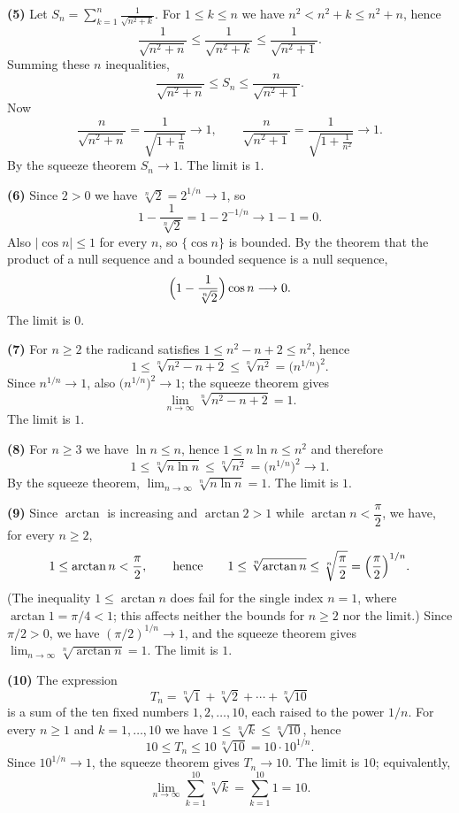 \documentclass[11pt,a4paper]{article}
\newenvironment{solution}[1]{%
  \par\addvspace{1.7ex}%
  \noindent{\color{solutioncolor}\textbf{#1}}\hspace{0.55em}\ignorespaces}%
  {\par\addvspace{0.9ex}}
\begin{document}
\begin{solution}{Solution 2.1.4}
\medskip
\noindent\textbf{(5)} Let
$S_n=\displaystyle\sum_{k=1}^{n}\frac{1}{\sqrt{n^{2}+k}}$. For $1\le k\le n$ we
have $n^{2}<n^{2}+k\le n^{2}+n$, hence
\[
  \frac{1}{\sqrt{n^{2}+n}}\le\frac{1}{\sqrt{n^{2}+k}}\le\frac{1}{\sqrt{n^{2}+1}} .
\]
Summing these $n$ inequalities,
\[
  \frac{n}{\sqrt{n^{2}+n}}\le S_n\le\frac{n}{\sqrt{n^{2}+1}} .
\]
Now
\[
  \frac{n}{\sqrt{n^{2}+n}}=\frac{1}{\sqrt{1+\tfrac1n}}\longrightarrow1,
  \qquad
  \frac{n}{\sqrt{n^{2}+1}}=\frac{1}{\sqrt{1+\tfrac{1}{n^{2}}}}\longrightarrow1 .
\]
By the squeeze theorem $S_n\to1$. The limit is $\boxed{1}$.

\medskip
\noindent\textbf{(6)} Since $2>0$ we have $\sqrt[n]{2}=2^{1/n}\to1$, so
\[
  1-\frac{1}{\sqrt[n]{2}}=1-2^{-1/n}\longrightarrow1-1=0 .
\]
Also $|\cos n|\le1$ for every $n$, so $\{\cos n\}$ is bounded. By the theorem
that the product of a null sequence and a bounded sequence is a null sequence,
\[
  \Bigl(1-\frac{1}{\sqrt[n]{2}}\Bigr)\cos n\longrightarrow0 .
\]
The limit is $\boxed{0}$.

\medskip
\noindent\textbf{(7)} For $n\ge2$ the radicand satisfies
$1\le n^{2}-n+2\le n^{2}$, hence
\[
  1\le\sqrt[n]{n^{2}-n+2}\le\sqrt[n]{n^{2}}=\bigl(n^{1/n}\bigr)^{2} .
\]
Since $n^{1/n}\to1$, also $\bigl(n^{1/n}\bigr)^{2}\to1$; the squeeze theorem gives
\[
  \lim_{n\to\infty}\sqrt[n]{n^{2}-n+2}=1 .
\]
The limit is $\boxed{1}$.

\medskip
\noindent\textbf{(8)} For $n\ge3$ we have $\ln n\le n$, hence
$1\le n\ln n\le n^{2}$ and therefore
\[
  1\le\sqrt[n]{n\ln n}\le\sqrt[n]{n^{2}}=\bigl(n^{1/n}\bigr)^{2}\longrightarrow1 .
\]
By the squeeze theorem, $\displaystyle\lim_{n\to\infty}\sqrt[n]{n\ln n}=1$. The
limit is $\boxed{1}$.

\medskip
\noindent\textbf{(9)} Since $\arctan$ is increasing and $\arctan 2>1$ while
$\arctan n<\dfrac\pi2$, we have, for every $n\ge2$,
\[
  1\le\arctan n<\frac\pi2,
  \qquad\text{hence}\qquad
  1\le\sqrt[n]{\arctan n}\le\sqrt[n]{\frac\pi2}=\Bigl(\frac\pi2\Bigr)^{1/n} .
\]
(The inequality $1\le\arctan n$ does fail for the single index $n=1$, where
$\arctan1=\pi/4<1$; this affects neither the bounds for $n\ge2$ nor the limit.)
Since $\pi/2>0$, we have $(\pi/2)^{1/n}\to1$, and the squeeze theorem gives
$\displaystyle\lim_{n\to\infty}\sqrt[n]{\arctan n}=1$. The limit is
$\boxed{1}$.

\medskip
\noindent\textbf{(10)} The expression
\[
  T_n=\sqrt[n]{1}+\sqrt[n]{2}+\cdots+\sqrt[n]{10}
\]
is a sum of the ten fixed numbers $1,2,\dots,10$, each raised to the power
$1/n$. For every $n\ge1$ and $k=1,\dots,10$ we have $1\le\sqrt[n]{k}\le\sqrt[n]{10}$,
hence
\[
  10\le T_n\le 10\,\sqrt[n]{10}=10\cdot10^{1/n} .
\]
Since $10^{1/n}\to1$, the squeeze theorem gives $T_n\to10$. The limit is
$\boxed{10}$; equivalently,
\[
  \lim_{n\to\infty}\sum_{k=1}^{10}\sqrt[n]{k}=\sum_{k=1}^{10}1=10 .
\]


\end{solution}
\end{document}
